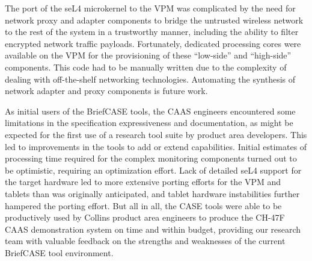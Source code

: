 
The port of the seL4 microkernel to the VPM was complicated by the need for network
proxy and adapter components to bridge the untrusted wireless network to the rest of the system in a trustworthy
manner, including the ability to filter encrypted network traffic payloads. Fortunately, dedicated
processing cores were available on the VPM for the provisioning of these ``low-side'' and ``high-side''
components. This code had to be manually written due to the complexity of dealing with
off-the-shelf networking technologies.  Automating the synthesis of network adapter and proxy components
is future work.

As initial users of the BriefCASE tools, the CAAS engineers encountered some limitations in the
specification expressiveness and documentation, as might be
expected for the first use of a research tool suite by product area developers. 
This led to improvements in the tools to add or extend capabilities.  Initial estimates of
processing time required for the complex monitoring components turned out to be optimistic,
requiring an optimization effort. Lack of detailed seL4 support for the target hardware led to more
extensive porting efforts for the VPM and tablets than was originally anticipated, and tablet
hardware instabilities further hampered the porting effort. But all in all, the CASE tools were able
to be productively used by Collins product area engineers to produce the CH-47F CAAS demonstration
system on time and within budget, providing our research team with valuable feedback on the
strengths and weaknesses of the current BriefCASE tool environment.
